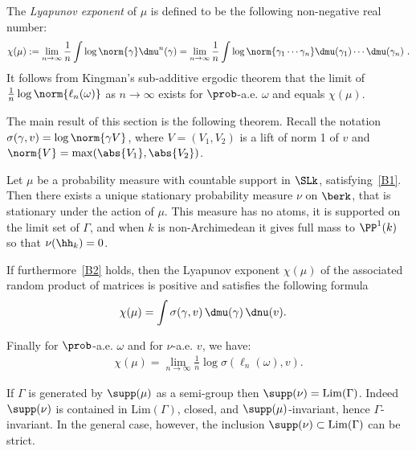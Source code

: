 The \emph{Lyapunov exponent} of $\mu$ is defined to be the following non-negative real number:
\begin{equation}\label{def:lyapunov exponent}
\chi (\mu) : = \lim _{n\rightarrow \infty} \frac{1}{n}\int
\log \norm{\gamma} \dmu^{n}(\gamma) = \lim _{n\rightarrow \infty} \frac{1}{n}\int \log \norm{ \gamma_1\cdots
\gamma_n} \dmu(\gamma_1)\cdots \dmu(\gamma_n)~.
\end{equation}
It follows from Kingman's sub-additive ergodic theorem that the limit of $ \frac1n \log \norm {\ell_n(\omega)}$ as $n\to\infty$ exists for $\prob$-a.e. $\omega$ and equals $\chi(\mu)$.


The main result of this section is the following theorem. Recall the notation $\sigma(\gamma, v) = \log\norm{\gamma V}$, where $V = (V_1, V_2)$ is a lift of norm 1 of $v$ and $\norm{V} = \max(\abs{V_1}, \abs{V_2})$.

\begin{theo}\label{thm:positive}
Let $\mu$ be a probability measure with countable support in $\SLk$, satisfying~\eqref{B1}. Then there exists a unique stationary probability measure $\nu$ on $\berk$, that is stationary under the action of $\mu$. This measure has no atoms, it is supported on the limit set of $\Gamma$, and when $k$ is non-Archimedean it gives full mass to $\PP^1(k)$ so that $\nu (\hh_k)=0$.

If furthermore~\eqref{B2} holds, then the Lyapunov exponent $\chi(\mu)$ of the associated random product of matrices is positive and satisfies the following formula
\begin{align}\label{eq:furstenberg}
\chi(\mu) & = \int \sigma(\gamma, v) \, \dmu(\gamma)\, \dnu(v).
\end{align}

Finally for $\prob$-a.e. $\omega$ and for $\nu$-a.e. $v$, we have:
\begin{align}
\chi(\mu) = \lim_{n\to\infty} \frac1n \log \sigma(\ell_n(\omega), v) \label{eq301}
.
\end{align}
\end{theo}

\begin{rema}
If $\Gamma$ is generated by $\supp(\mu)$ as a semi-group then $\supp(\nu) = \mathrm{Lim}(\Gamma)$. Indeed $\supp(\nu)$ is contained in $\mathrm{Lim}(\Gamma)$, closed, and $\supp(\mu)$-invariant, hence $\Gamma$-invariant. In the general case, however, the inclusion $\supp(\nu)\subset \mathrm{Lim}(\Gamma)$ can be strict.
\end{rema}

